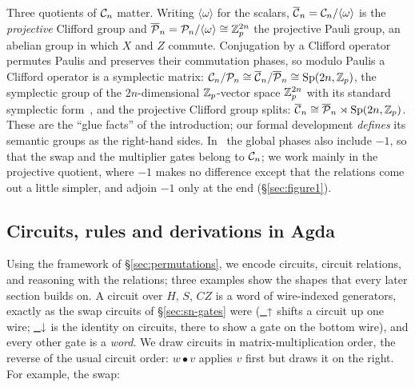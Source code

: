 Three quotients of $\mathcal{C}_{n}$ matter.  Writing $\langle\omega\rangle$ for
the scalars, $\overline{\mathcal{C}}_{n} = \mathcal{C}_{n}/\langle\omega\rangle$ is the
\emph{projective} Clifford group and $\overline{\mathcal{P}}_{n} =
\mathcal{P}_{n}/\langle\omega\rangle \cong \mathbb{Z}_p^{2n}$ the projective Pauli group,
an abelian group in which $X$ and $Z$ commute.  Conjugation by a Clifford
operator permutes Paulis and preserves their commutation phases, so
modulo Paulis a Clifford operator is a symplectic matrix: $\mathcal{C}_{n}/\mathcal{P}_{n}
\cong \overline{\mathcal{C}}_{n}/\overline{\mathcal{P}}_{n} \cong \mathrm{Sp}(2n,\mathbb{Z}_p)$, the symplectic group of the
$2n$-dimensional $\mathbb{Z}_p$-vector space $\mathbb{Z}_p^{2n}$ with its standard
symplectic form~\cite{bian2026qudit}, and the projective Clifford group
splits: $\overline{\mathcal{C}}_{n} \cong \overline{\mathcal{P}}_{n} \rtimes \mathrm{Sp}(2n,\mathbb{Z}_p)$.  These are the ``glue
facts'' of the introduction; our formal development \emph{defines} its
semantic groups as the right-hand sides.  In~\cite{bian2026qudit} the
global phases also include $-1$, so that the swap and the multiplier
gates belong to $\mathcal{C}_{n}$; we work mainly in the projective quotient,
where $-1$ makes no difference except that the relations come out a
little simpler, and adjoin $-1$ only at the end (\S\ref{sec:figure1}).

\subsection{Circuits, rules and derivations in Agda}\label{sec:encoding}

Using the framework of \S\ref{sec:permutations}, we encode circuits,
circuit relations, and reasoning with the relations; three examples
show the shapes that every later section builds on.  A circuit over
$H$, $S$, $CZ$ is a word of wire-indexed generators, exactly as the
swap circuits of \S\ref{sec:sn-gates} were ($\mbox{\textsf{\small {\_}↑}}$ shifts a
circuit up one wire; $\mbox{\textsf{\small {\_}↓}}$ is the identity on circuits, there
to show a gate on the bottom wire), and every other gate is a
\emph{word}.  We draw circuits in matrix-multiplication order, the
reverse of the usual circuit order: $w \bullet v$ applies $v$ first
but draws it on the right.  For example, the swap:

